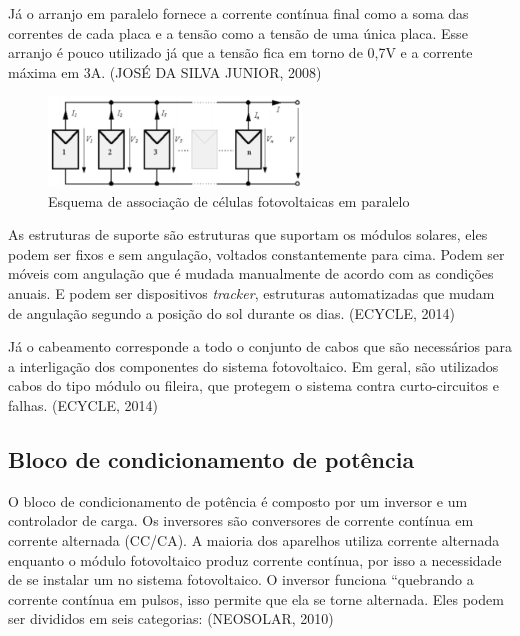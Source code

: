 Já o arranjo em paralelo fornece a corrente contínua final como a soma das correntes de cada placa e a tensão como a tensão de uma única placa. Esse arranjo é pouco utilizado já que a tensão fica em torno de 0,7V e a corrente máxima em 3A. (JOSÉ DA SILVA JUNIOR, 2008)

\begin{figure}[!h]
\centering
\includegraphics[width=0.6\textwidth]{figuras/associacaoserie.png}
\caption{Esquema de associação de células fotovoltaicas em paralelo}
\end{figure}

As estruturas de suporte são estruturas que suportam os módulos solares, eles podem ser fixos e sem angulação, voltados constantemente para cima. Podem ser móveis com
angulação que é mudada manualmente de acordo com as condições anuais. E podem ser dispositivos \textit{tracker}, estruturas automatizadas que mudam de angulação segundo a posição do sol durante os dias. (ECYCLE, 2014)

\par Já o cabeamento corresponde a todo o conjunto de cabos que são necessários para a interligação dos componentes do sistema fotovoltaico. Em geral, são utilizados cabos do tipo módulo ou fileira, que protegem o sistema contra curto-circuitos e falhas. (ECYCLE, 2014)

\subsection{Bloco de condicionamento de potência}

O bloco de condicionamento de potência é composto por um inversor e um controlador de carga. Os inversores são conversores de corrente contínua em corrente alternada (CC/CA). A maioria dos aparelhos utiliza corrente alternada enquanto o módulo fotovoltaico produz corrente contínua, por isso a necessidade de se instalar um no sistema fotovoltaico. O inversor funciona ``quebrando a corrente contínua em pulsos, isso permite que ela se torne alternada. Eles podem ser divididos em seis categorias: (NEOSOLAR, 2010)

